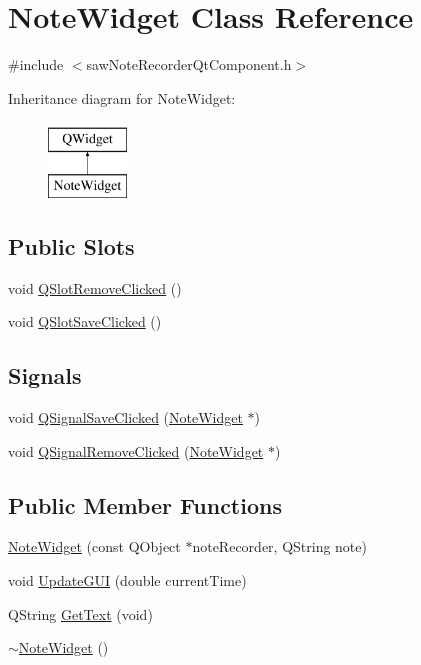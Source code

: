\hypertarget{class_note_widget}{\section{Note\-Widget Class Reference}
\label{class_note_widget}
}


{\ttfamily \#include $<$saw\-Note\-Recorder\-Qt\-Component.\-h$>$}

Inheritance diagram for Note\-Widget\-:\begin{figure}[H]
\begin{center}
\leavevmode
\includegraphics[height=2.000000cm]{dc/d45/class_note_widget}
\end{center}
\end{figure}
\subsection*{Public Slots}
\begin{DoxyCompactItemize}
\item 
void \hyperlink{class_note_widget_a2f63d2838144e5dc403726e5247be0ed}{Q\-Slot\-Remove\-Clicked} ()
\item 
void \hyperlink{class_note_widget_a77c7082ed59d8685d978b8222eb2006d}{Q\-Slot\-Save\-Clicked} ()
\end{DoxyCompactItemize}
\subsection*{Signals}
\begin{DoxyCompactItemize}
\item 
void \hyperlink{class_note_widget_a906399d5dee94c90427c77f6e5f54bc0}{Q\-Signal\-Save\-Clicked} (\hyperlink{class_note_widget}{Note\-Widget} $\ast$)
\item 
void \hyperlink{class_note_widget_a8829ccf707d99486fa870a2aad90ebc6}{Q\-Signal\-Remove\-Clicked} (\hyperlink{class_note_widget}{Note\-Widget} $\ast$)
\end{DoxyCompactItemize}
\subsection*{Public Member Functions}
\begin{DoxyCompactItemize}
\item 
\hyperlink{class_note_widget_a96a21ea07d4ea1c0a188fcb6094abd7e}{Note\-Widget} (const Q\-Object $\ast$note\-Recorder, Q\-String note)
\item 
void \hyperlink{class_note_widget_afdab46348f40af1487ff73c06e08d3ab}{Update\-G\-U\-I} (double current\-Time)
\item 
Q\-String \hyperlink{class_note_widget_a8b1415368d41773530313932d572ffca}{Get\-Text} (void)
\item 
\hyperlink{class_note_widget_a120a4618c97b61339060de31aac78114}{$\sim$\-Note\-Widget} ()
\end{DoxyCompactItemize}


